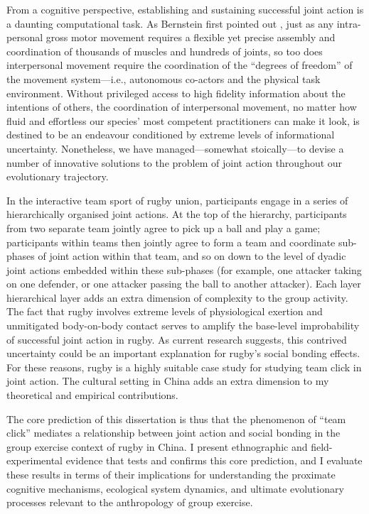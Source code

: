 \begin{CJK}{UTF8}{gbsn}
From a cognitive perspective, establishing and sustaining successful joint action is a daunting computational task.  As Bernstein first pointed out \textcite{Bernstein1967}, just as any intra-personal gross motor movement requires a flexible yet precise assembly and coordination of thousands of muscles and hundreds of joints, so too does interpersonal movement require the coordination of the ``degrees of freedom'' of the movement system---i.e., autonomous co-actors and the physical task environment.  Without privileged access to high fidelity information about the intentions of others, the coordination of interpersonal movement, no matter how fluid and effortless our species' most competent practitioners can make it look, is destined to be an endeavour conditioned by extreme levels of informational uncertainty.  Nonetheless, we have managed---somewhat stoically---to devise a number of innovative solutions to the problem of joint action throughout our evolutionary trajectory.

In the interactive team sport of rugby union, participants engage in a series of hierarchically organised joint actions. At the top of the hierarchy, participants from two separate team jointly agree to pick up a ball and play a game; participants within teams then jointly agree to form a team and coordinate sub-phases of joint action within that team, and so on down to the level of dyadic joint actions embedded within these sub-phases (for example, one attacker taking on one defender, or one attacker passing the ball to another attacker). Each layer hierarchical layer adds an extra dimension of complexity to the group activity.  The fact that rugby involves extreme levels of physiological exertion and unmitigated body-on-body contact serves to amplify the base-level improbability of successful joint action in rugby.  As current research suggests, this contrived uncertainty could be an important explanation for rugby's social bonding effects.  For these reasons, rugby is a highly suitable case study for studying team click in joint action.  The cultural setting in China adds an extra dimension to my theoretical and empirical contributions.

The core prediction of this dissertation is thus that the phenomenon of ``team click'' mediates a relationship between joint action and social bonding in the group exercise context of rugby in China.  I present ethnographic and field-experimental evidence that tests and confirms this core prediction, and I evaluate these results in terms of their implications for understanding the proximate cognitive mechanisms, ecological system dynamics, and ultimate evolutionary processes relevant to the anthropology of group exercise.


\end{CJK}
